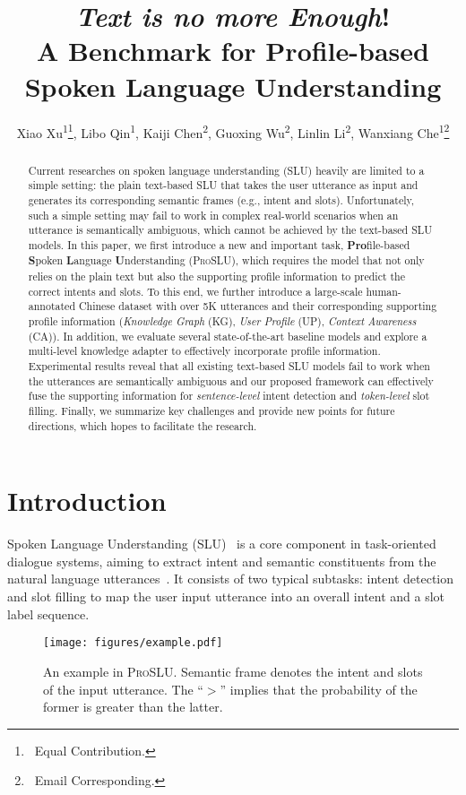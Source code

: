 \documentclass[letterpaper]{article} \usepackage{aaai22}  \usepackage{times}  \usepackage{helvet}  \usepackage{courier}  \usepackage[hyphens]{url}  \usepackage{graphicx} \urlstyle{rm} \def\UrlFont{\rm}  \usepackage{natbib}  \usepackage{caption} \DeclareCaptionStyle{ruled}{labelfont=normalfont,labelsep=colon,strut=off} \frenchspacing  \setlength{\pdfpagewidth}{8.5in}  \setlength{\pdfpageheight}{11in}  \usepackage{algorithm}
\title{
  \textit{Text is no more Enough}!
  \\ A Benchmark for Profile-based Spoken Language Understanding
}
\author{
    Xiao Xu\textsuperscript{\rm 1}\thanks{\ Equal Contribution.},
    Libo Qin\textsuperscript{\rm 1}\footnotemark[1], 
    Kaiji Chen\textsuperscript{\rm 2}, 
    Guoxing Wu\textsuperscript{\rm 2}, 
    Linlin Li\textsuperscript{\rm 2}, 
    Wanxiang Che\textsuperscript{\rm 1}\thanks{\ Email Corresponding.}
}
\begin{document}
\maketitle
\begin{abstract} \label{Abstract}
	Current researches on spoken language understanding (SLU) heavily are limited to a simple setting: the plain text-based SLU that takes the user utterance as input and generates its corresponding semantic frames (e.g., intent and slots). 
	Unfortunately, such a simple setting may fail to work in complex real-world scenarios when an utterance is semantically ambiguous, which cannot be achieved by the text-based SLU models.
    In this paper, we first introduce a new and important task, \textbf{Pro}file-based \textbf{S}poken \textbf{L}anguage \textbf{U}nderstanding (\textsc{ProSLU}), which requires the model that not only relies on the plain text but also the supporting profile information to predict the correct intents and slots.
    To this end, we further introduce a large-scale human-annotated Chinese dataset with over 5K utterances and their corresponding supporting profile information (\textit{Knowledge Graph} (KG), \textit{User Profile} (UP), \textit{Context Awareness} (CA)).
    In addition,  we evaluate several state-of-the-art baseline models and explore a multi-level knowledge adapter to effectively incorporate profile information. 
    Experimental results reveal that all existing text-based SLU models fail to work when the utterances are semantically ambiguous and our proposed framework can effectively fuse the supporting information for \textit{sentence-level} intent detection and \textit{token-level} slot filling.
    Finally, we summarize key challenges and provide new points for future directions, which hopes to facilitate the research.
\end{abstract} \section{Introduction}
\label{Introduction}
Spoken Language Understanding (SLU)~\citep{young2013pomdp,ijcai2021-622} is a core component in task-oriented dialogue systems, aiming to extract intent and semantic constituents from the natural language utterances~\citep{tur2011spoken}.
It consists of two typical subtasks: intent detection and slot filling to map the user input utterance into an overall intent and a slot label sequence.

\begin{figure}[t]
	\centering
	\texttt{[image: figures/example.pdf]}
	\caption{An example in \textsc{ProSLU}. Semantic frame denotes the intent and slots of the input utterance. The ``$>$''  implies that the probability of the former is greater than the latter.
	}
	\label{fig:example-simple}
\end{figure}
\end{document}
